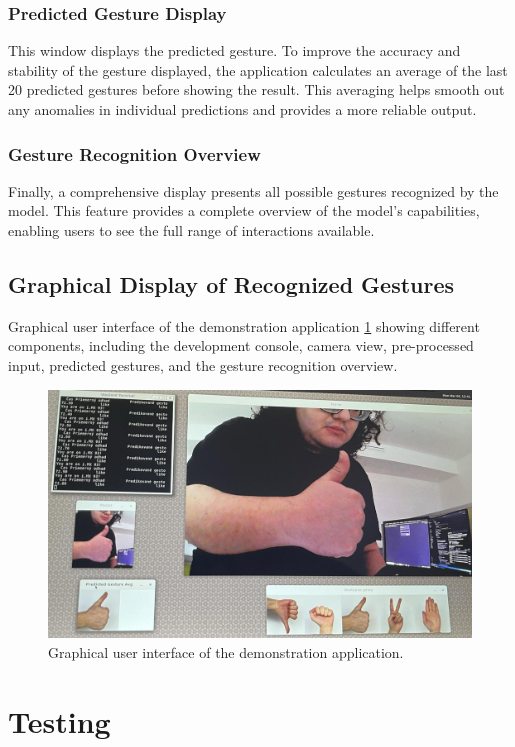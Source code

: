 \subsection{Predicted Gesture Display}
This window displays the predicted gesture. To improve the accuracy and stability of the gesture displayed, the application calculates an average of the last 20 predicted gestures before showing the result. This averaging helps smooth out any anomalies in individual predictions and provides a more reliable output.

\subsection{Gesture Recognition Overview}
Finally, a comprehensive display presents all possible gestures recognized by the model. This feature provides a complete overview of the model's capabilities, enabling users to see the full range of interactions available.

\section{Graphical Display of Recognized Gestures}
Graphical user interface of the demonstration application \ref{fig:ui_demo} showing different components, including the development console, camera view, pre-processed input, predicted gestures, and the gesture recognition overview.

\begin{figure}[H]
\centering
\includegraphics[width=\textwidth]{obrazky-figures/me_gesturing.png}
\caption{Graphical user interface of the demonstration application.}
\label{fig:ui_demo}
\end{figure}

\chapter{Testing}
